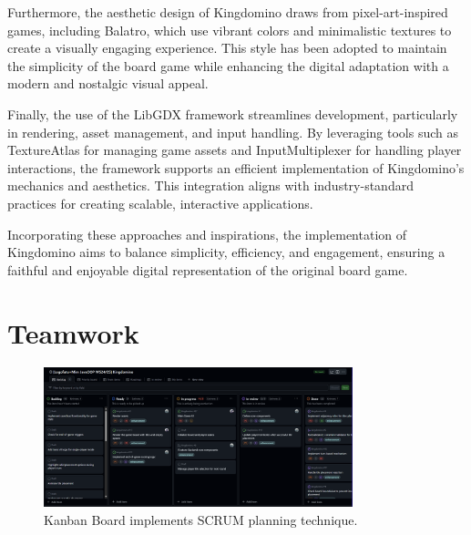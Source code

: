\documentclass[conference]{IEEEtran}
\begin{document}
Furthermore, the aesthetic design of Kingdomino draws from pixel-art-inspired
games, including Balatro\cite{wiki:balatro}, which use vibrant colors and
minimalistic textures to create a visually engaging experience. This style has
been adopted to maintain the simplicity of the board game while enhancing the
digital adaptation with a modern and nostalgic visual appeal.

Finally, the use of the LibGDX framework\cite{libgdx} streamlines development,
particularly in rendering, asset management, and input handling. By leveraging
tools such as TextureAtlas\cite{wiki:textureatlas} for managing game assets and
InputMultiplexer for handling player interactions, the framework supports an
efficient implementation of Kingdomino's mechanics and aesthetics. This
integration aligns with industry-standard practices for creating scalable,
interactive applications.

Incorporating these approaches and inspirations, the implementation of
Kingdomino aims to balance simplicity, efficiency, and engagement, ensuring a
faithful and enjoyable digital representation of the original board game.


\section{Teamwork}

\begin{figure}[htbp]
    \centerline{\includegraphics[width=0.8\textwidth]{assets/github-project.png}}
    \caption{Kanban Board implements SCRUM planning technique.}\label{fig:kanban}
\end{figure}
\end{document}
